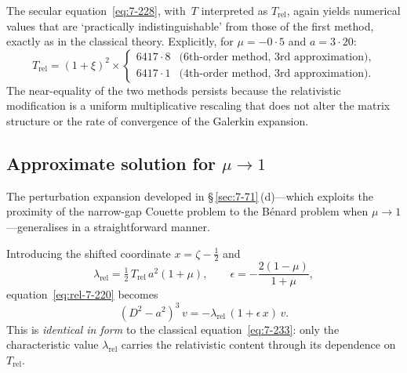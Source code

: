 The secular equation~\eqref{eq:7-228}, with~$T$ interpreted as
$T_{\mathrm{rel}}$, again yields numerical values that are
`practically indistinguishable' from those of the first method,
exactly as in the classical theory.  Explicitly, for
$\mu = -0{\cdot}5$ and $a = 3{\cdot}20$:
\begin{equation}
\label{eq:rel-7-230}
T_{\mathrm{rel}} = (1+\xi)^{2} \times
\begin{cases}
6417{\cdot}8 & \text{(6th-order method, 3rd approximation)},\\
6417{\cdot}1 & \text{(4th-order method, 3rd approximation)}.
\end{cases}
\end{equation}
The near-equality of the two methods persists because the
relativistic modification is a uniform multiplicative rescaling
that does not alter the matrix structure or the rate of convergence
of the Galerkin expansion.

\subsection{Approximate solution for $\mu \to 1$}\label{sec:rel-71-approx}

The perturbation expansion developed in
\S\,\ref{sec:7-71}\,(d)---which exploits the proximity of the
narrow-gap Couette problem to the B\'enard problem when
$\mu \to 1$---generalises in a straightforward manner.

Introducing the shifted coordinate $x = \zeta - \tfrac{1}{2}$ and
\begin{equation}
\label{eq:rel-7-234}
\lambda_{\mathrm{rel}}
  = \tfrac{1}{2}\,T_{\mathrm{rel}}\,a^{2}(1+\mu),
\qquad
\epsilon = -\frac{2(1-\mu)}{1+\mu},
\end{equation}
equation~\eqref{eq:rel-7-220} becomes
\begin{equation}
\label{eq:rel-7-235}
(D^{2}-a^{2})^{3}\,v
  = -\lambda_{\mathrm{rel}}\,(1+\epsilon\,x)\,v.
\end{equation}
This is \emph{identical in form} to the classical
equation~\eqref{eq:7-233}: only the characteristic value
$\lambda_{\mathrm{rel}}$ carries the relativistic content through
its dependence on~$T_{\mathrm{rel}}$.

